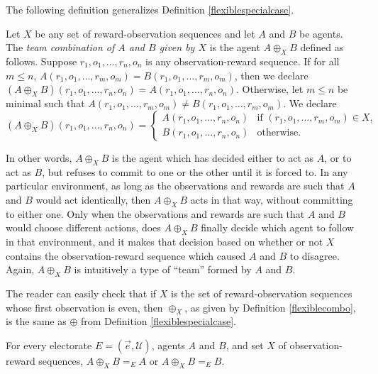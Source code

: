 \documentclass[twoside,11pt]{article}
\begin{document}
The following definition generalizes Definition \ref{flexiblespecialcase}.

\begin{definition}
\label{flexiblecombo}
    Let $X$ be any set of reward-observation sequences and let $A$ and $B$ be agents.
    The \emph{team combination of $A$ and $B$ given by $X$} is the agent
    $A\oplus_X B$ defined as follows.
    Suppose $r_1,o_1,\ldots,r_n,o_n$ is any observation-reward sequence.
    If for all $m\leq n$, $A(r_1,o_1,\ldots,r_m,o_m)=B(r_1,o_1,\ldots,r_m,o_m)$,
    then we declare $(A\oplus_X B)(r_1,o_1,\ldots,r_n,o_n)=A(r_1,o_1,\ldots,r_n,o_n)$.
    Otherwise, let $m\leq n$ be minimal such that
    $A(r_1,o_1,\ldots,r_m,o_m)\neq B(r_1,o_1,\ldots,r_m,o_m)$.
    We declare
    \[
        (A\oplus_X B)(r_1,o_1,\ldots,r_n,o_n) =
        \begin{cases}
            A(r_1,o_1,\ldots,r_n,o_n) & \mbox{if $(r_1,o_1,\ldots,r_m,o_m)\in X$},\\
            B(r_1,o_1,\ldots,r_n,o_n) & \mbox{otherwise}.
        \end{cases}
    \]
\end{definition}

In other words, $A\oplus_X B$ is the agent which has decided either to act as $A$,
or to act as $B$, but refuses to commit to one or the other until it is forced to.
In any particular environment, as long as the observations and rewards are such that
$A$ and $B$ would act identically, then $A\oplus_X B$ acts in that way, without
committing to either one. Only when the observations and rewards are such that $A$
and $B$ would choose different actions, does $A\oplus_X B$ finally decide which agent
to follow in that environment, and it makes that decision based on whether or not
$X$ contains the observation-reward sequence which caused $A$ and $B$ to disagree.
Again, $A\oplus_X B$ is intuitively a type of ``team'' formed by $A$ and $B$.

The reader can easily check that if $X$ is the set of reward-observation sequences whose first
observation is even, then $\oplus_X$, as given by Definition \ref{flexiblecombo},
is the same as $\oplus$ from Definition \ref{flexiblespecialcase}.

\begin{proposition}
\label{splittingproposition}
    For every electorate $E=(\vec{e},\mathscr U)$, agents $A$ and $B$, and set $X$ of
    observation-reward sequences,
    $A\oplus_X B =_{E} A$ or $A\oplus_X B =_{E}B$.
\end{proposition}
\end{document}
